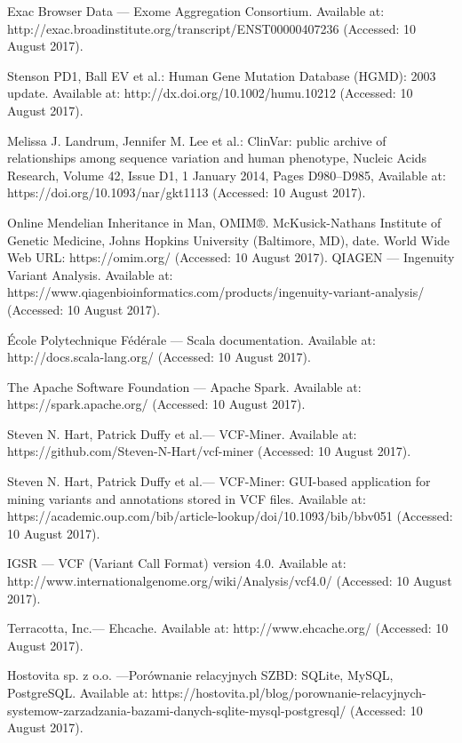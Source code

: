 \documentclass[a4paper,12pt,twoside]{article}
\begin{document}
\begin{thebibliography}{99}
Exac Browser Data — Exome Aggregation Consortium.
Available at: http://exac.broadinstitute.org/transcript/ENST00000407236 (Accessed: 10 August 2017).

Stenson PD1, Ball EV  et al.: Human Gene Mutation Database (HGMD): 2003 update.
Available at: http://dx.doi.org/10.1002/humu.10212 (Accessed: 10 August 2017).

Melissa J. Landrum, Jennifer M. Lee et al.: ClinVar: public archive of relationships among sequence variation and human phenotype, Nucleic Acids Research, Volume 42, Issue D1, 1 January 2014, Pages D980–D985, Available at: https://doi.org/10.1093/nar/gkt1113 (Accessed: 10 August 2017).

Online Mendelian Inheritance in Man, OMIM®. McKusick-Nathans Institute of Genetic Medicine, Johns Hopkins University (Baltimore, MD), {date}. World Wide Web URL: https://omim.org/  (Accessed: 10 August 2017).
QIAGEN — Ingenuity Variant Analysis.
Available at: https://www.qiagenbioinformatics.com/products/ingenuity-variant-analysis/ (Accessed: 10 August 2017).

École Polytechnique Fédérale — Scala documentation.
Available at: http://docs.scala-lang.org/ (Accessed: 10 August 2017).

The Apache Software Foundation — Apache Spark. Available at: https://spark.apache.org/ (Accessed: 10 August 2017).

Steven N. Hart, Patrick Duffy et al.— VCF-Miner.
Available at: https://github.com/Steven-N-Hart/vcf-miner (Accessed: 10 August 2017).

Steven N. Hart, Patrick Duffy et al.— VCF-Miner: GUI-based application for mining variants and annotations stored in VCF files.
Available at: https://academic.oup.com/bib/article-lookup/doi/10.1093/bib/bbv051 (Accessed: 10 August 2017).

IGSR — VCF (Variant Call Format) version 4.0.
Available at: http://www.internationalgenome.org/wiki/Analysis/vcf4.0/ (Accessed: 10 August 2017).

Terracotta, Inc.— Ehcache.
Available at: http://www.ehcache.org/ (Accessed: 10 August 2017).

Hostovita sp. z o.o. —Porównanie relacyjnych SZBD: SQLite, MySQL, PostgreSQL.
Available at:
https://hostovita.pl/blog/porownanie-relacyjnych-systemow-zarzadzania-bazami-danych-sqlite-mysql-postgresql/ (Accessed: 10 August 2017).


\end{thebibliography}
\end{document}
